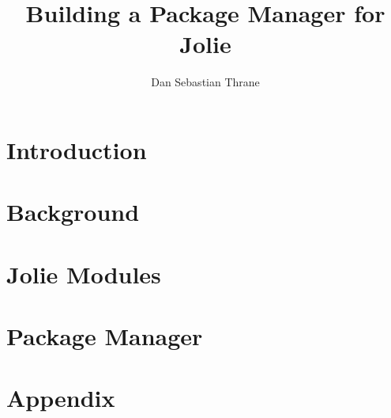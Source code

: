 \documentclass[11pt, a4paper]{report} %
\title{Building a Package Manager for Jolie}
\author{Dan Sebastian Thrane}
\theoremstyle{definition}
\newcommand{\blankpage}{
  \newpage
  \thispagestyle{empty}
  \mbox{}
  \newpage
}
\begin{document}

\tableofcontents

\blankpage

\pagestyle{MyStyle}

\chapter{Introduction}


\chapter{Background}


\chapter{Jolie Modules}


\chapter{Package Manager}


\appendix
\chapter{Appendix}

\end{document}

